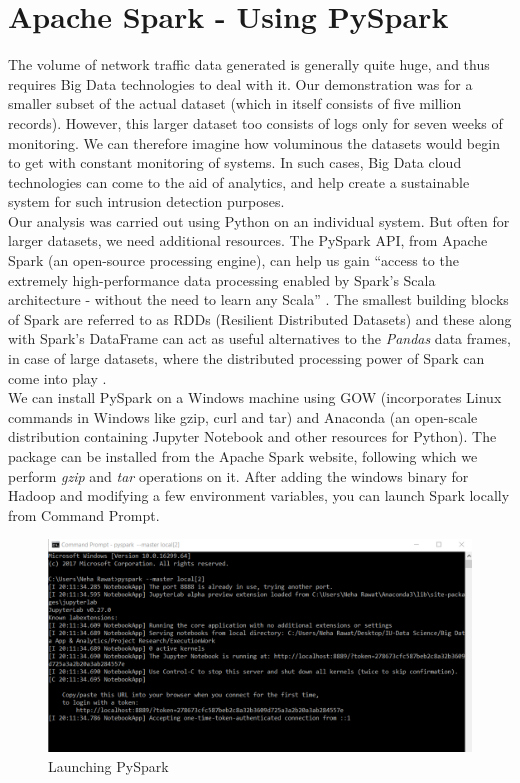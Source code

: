 \section{Apache Spark - Using PySpark}
The volume of network traffic data generated is generally quite huge, and thus requires Big Data technologies to deal with it. Our demonstration was for a smaller subset of the actual dataset (which in itself consists of five million records). However, this larger dataset too consists of logs only for seven weeks of monitoring. We can therefore imagine how voluminous the datasets would begin to get with constant monitoring of systems. In such cases, Big Data cloud technologies can come to the aid of analytics, and help create a sustainable system for such intrusion detection purposes.\\
Our analysis was carried out using Python on an individual system. But often for larger datasets, we need additional resources. The PySpark API, from Apache Spark (an open-source processing engine), can help us  gain ``access to the extremely high-performance data processing enabled by Spark's Scala architecture - without the need to learn any Scala'' \cite{pysp11}. The smallest building blocks of Spark are referred to as RDDs (Resilient Distributed Datasets) and these along with Spark's DataFrame can act as useful alternatives to the {\em Pandas} data frames, in case of large datasets, where the distributed processing power of Spark can come into play \cite{pysp11}.\\
We can install PySpark on a Windows machine using GOW (incorporates Linux commands in Windows like gzip, curl and tar) and Anaconda (an open-scale distribution containing Jupyter Notebook and other resources for Python). The package can be installed from the Apache Spark website, following which we perform {\em gzip} and {\em tar} operations on it. After adding the windows binary for Hadoop and modifying a few environment variables, you can launch Spark locally from Command Prompt. 
\begin{figure}
	\includegraphics[width=1.0\columnwidth]{images/pyspark.PNG}
	\caption{Launching PySpark}
	\label{F:ps}
\end{figure}
